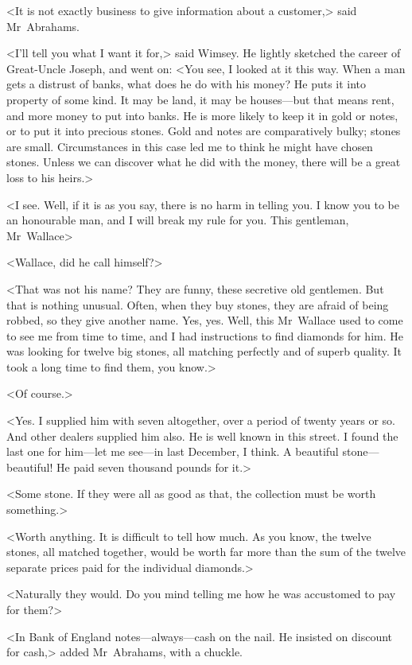 <It is not exactly business to give information about a customer,> said Mr~Abrahams.

<I'll tell you what I want it for,> said Wimsey. He lightly sketched the career of Great-Uncle Joseph, and went on: <You see, I looked at it this way. When a man gets a distrust of banks, what does he do with his money? He puts it into property of some kind. It may be land, it may be houses—but that means rent, and more money to put into banks. He is more likely to keep it in gold or notes, or to put it into precious stones. Gold and notes are comparatively bulky; stones are small. Circumstances in this case led me to think he might have chosen stones. Unless we can discover what he did with the money, there will be a great loss to his heirs.>

<I see. Well, if it is as you say, there is no harm in telling you. I know you to be an honourable man, and I will break my rule for you. This gentleman, Mr~Wallace\longdash>

<Wallace, did he call himself?>

<That was not his name? They are funny, these secretive old gentlemen. But that is nothing unusual. Often, when they buy stones, they are afraid of being robbed, so they give another name. Yes, yes. Well, this Mr~Wallace used to come to see me from time to time, and I had instructions to find diamonds for him. He was looking for twelve big stones, all matching perfectly and of superb quality. It took a long time to find them, you know.>

<Of course.>

<Yes. I supplied him with seven altogether, over a period of twenty years or so. And other dealers supplied him also. He is well known in this street. I found the last one for him—let me see—in last December, I think. A beautiful stone—beautiful! He paid seven thousand pounds for it.>

<Some stone. If they were all as good as that, the collection must be worth something.>

<Worth anything. It is difficult to tell how much. As you know, the twelve stones, all matched together, would be worth far more than the sum of the twelve separate prices paid for the individual diamonds.>

<Naturally they would. Do you mind telling me how he was accustomed to pay for them?>

<In Bank of England notes—always—cash on the nail. He insisted on discount for cash,> added Mr~Abrahams, with a chuckle.

